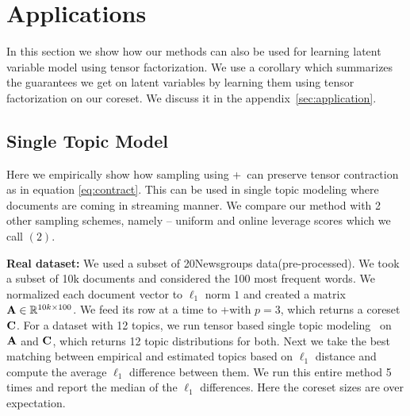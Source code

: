 \section{Applications}\label{sec:topic}
In this section we show how our methods can also be used for learning latent variable model using tensor factorization. We use a corollary which summarizes the guarantees we get on latent variables by learning them using tensor factorization on our coreset. We discuss it in the appendix~\ref{sec:application}.
\subsection{Single Topic Model}\label{exp}
Here we empirically show how sampling using \online+~can preserve tensor contraction as in equation \eqref{eq:contract}. This can be used in single topic modeling where documents are coming in streaming manner. We compare our method with 2 other sampling schemes, namely -- uniform and online leverage scores which we call \online$(2)$.

\textbf{Real dataset:} We used a subset of 20Newsgroups data(pre-processed). We took a subset of 10k documents and considered the 100 most frequent words. We normalized each document vector to $\ell_{1}$ norm $1$ and created a matrix $\mathbf{A} \in \mathbb{R}^{10k \times 100}$. We feed its row at a time to \online+ with $p=3$, which returns a coreset $\mathbf{C}$. For a dataset with 12 topics, we run tensor based single topic modeling~\cite{anandkumar2014tensor} on $\mathbf{A}$ and $\mathbf{C}$, which returns 12 topic distributions for both. Next we take the best matching between empirical and estimated topics based on $\ell_{1}$ distance and  compute the average $\ell_{1}$ difference between them. We run this entire method 5 times and report the median of the $\ell_{1}$ differences. Here the coreset sizes are over expectation.

